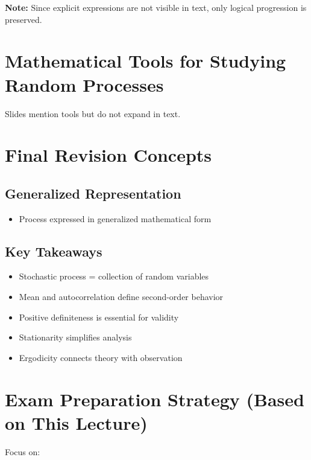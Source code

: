 \documentclass[12pt]{article}
\begin{document}
\textbf{Note:} Since explicit expressions are not visible in text, only logical progression is preserved.

\section{Mathematical Tools for Studying Random Processes}

Slides mention tools but do not expand in text.

\section{Final Revision Concepts}

\subsection{Generalized Representation}

\begin{itemize}
    \item Process expressed in generalized mathematical form
\end{itemize}

\subsection{Key Takeaways}

\begin{itemize}
    \item Stochastic process = collection of random variables
    \item Mean and autocorrelation define second-order behavior
    \item Positive definiteness is essential for validity
    \item Stationarity simplifies analysis
    \item Ergodicity connects theory with observation
\end{itemize}

\section*{Exam Preparation Strategy (Based on This Lecture)}

Focus on:
\end{document}
